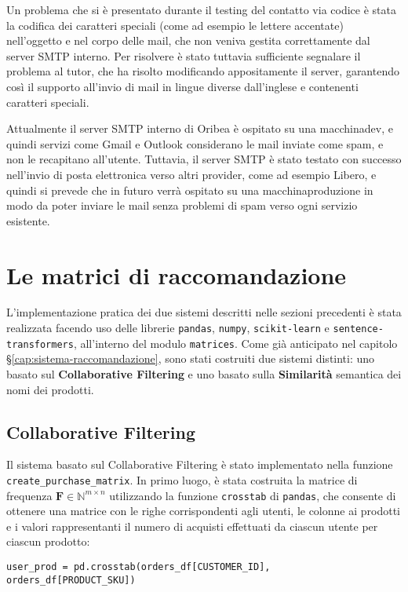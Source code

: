 Un problema che si è presentato durante il testing del contatto via codice è stata la codifica dei caratteri speciali (come ad esempio le lettere accentate) nell'oggetto e nel corpo delle mail, che non veniva gestita correttamente dal server SMTP interno. Per risolvere è stato tuttavia sufficiente segnalare il problema al tutor, che ha risolto modificando appositamente il server, garantendo così il supporto all'invio di mail in lingue diverse dall'inglese e contenenti caratteri speciali.

Attualmente il server SMTP interno di Oribea è ospitato su una \gls{macchinadev}, e quindi servizi come Gmail e Outlook considerano le mail inviate come spam, e non le recapitano all'utente. Tuttavia, il server SMTP è stato testato con successo nell'invio di posta elettronica verso altri provider, come ad esempio Libero, e quindi si prevede che in futuro verrà ospitato su una \gls{macchinaproduzione} in modo da poter inviare le mail senza problemi di spam verso ogni servizio esistente.


\section{Le matrici di raccomandazione}

L'implementazione pratica dei due sistemi descritti nelle sezioni precedenti è stata realizzata facendo uso delle librerie \texttt{pandas}, \texttt{numpy}, \texttt{scikit-learn} e \texttt{sentence-transformers}, all'interno del modulo \texttt{matrices}. Come già anticipato nel capitolo \S\ref{cap:sistema-raccomandazione}, sono stati costruiti due sistemi distinti: uno basato sul \textbf{Collaborative Filtering} e uno basato sulla \textbf{Similarità} semantica dei nomi dei prodotti.

\subsection{Collaborative Filtering}

Il sistema basato sul Collaborative Filtering è stato implementato nella funzione \texttt{create\_purchase\_matrix}. In primo luogo, è stata costruita la matrice di frequenza $\mathbf{F} \in \mathbb{N}^{m \times n}$ utilizzando la funzione \texttt{crosstab} di \texttt{pandas}, che consente di ottenere una matrice con le righe corrispondenti agli utenti, le colonne ai prodotti e i valori rappresentanti il numero di acquisti effettuati da ciascun utente per ciascun prodotto:

\begin{lstlisting}
user_prod = pd.crosstab(orders_df[CUSTOMER_ID], orders_df[PRODUCT_SKU])
\end{lstlisting}

